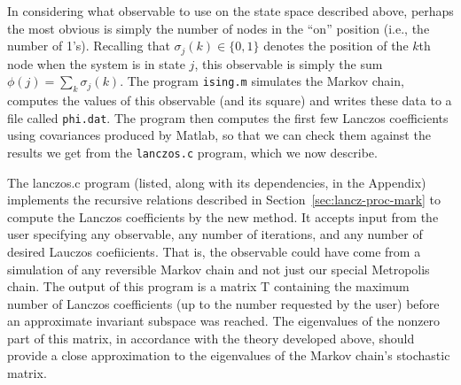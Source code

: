 In considering what observable to use on the state space described above, perhaps the
most obvious is simply the number of nodes in the ``on'' position (i.e., the
number of 1's). Recalling that $\sigma_j(k)\in \{0,1\}$ denotes the position of
the $k$th node when the system is in state $j$, this observable is simply the
sum $\phi(j) = \sum_k\sigma_j(k)$. 
The program {\tt ising.m} simulates the Markov chain, computes the
values of this observable (and its square) and writes these data to a file
called {\tt phi.dat}. 
The program then computes the first few Lanczos coefficients using covariances
produced by Matlab, so that we can check them against the results we get from the
{\tt lanczos.c} program, which we now describe.

The lanczos.c program (listed, along with its dependencies, in the Appendix) implements
the recursive relations described in Section~\ref{sec:lancz-proc-mark} %
to compute the Lanczos coefficients by the new
method. It accepts input from the user specifying any observable, any number of
iterations, and any 
%
%
%
%
number of desired Lauczos coefiicients. That is, the observable could have come from a simulation
of any reversible Markov chain and not just our special Metropolis chain. The output of this
program is a matrix T containing the maximum number of Lanczos coefficients (up
to the number requested by the user) before an approximate invariant subspace
was reached. The eigenvalues of the nonzero part of this matrix, in accordance
with the theory developed above, should provide a close approximation to the
eigenvalues of the Markov chain's stochastic matrix.

